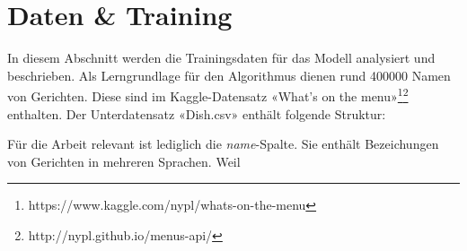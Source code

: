 \section{Daten \& Training}
\label{sec:model-data-training}

In diesem Abschnitt werden die Trainingsdaten für das Modell analysiert und beschrieben.
Als Lerngrundlage für den Algorithmus dienen rund 400000 Namen von Gerichten.
Diese sind im Kaggle-Datensatz «What's on the menu»\footnote{https://www.kaggle.com/nypl/whats-on-the-menu}\footnote{http://nypl.github.io/menus-api/} enthalten.
Der Unterdatensatz «Dish.csv» enthält folgende Struktur:


\begin{center}
\end{center}

Für die Arbeit relevant ist lediglich die \textit{name}-Spalte.
Sie enthält Bezeichungen von Gerichten in mehreren Sprachen.
Weil